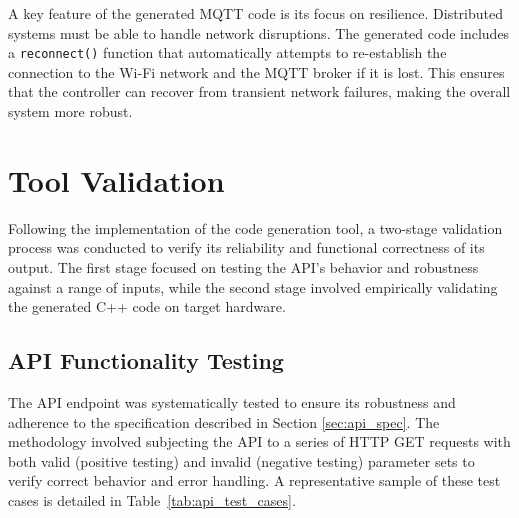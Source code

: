 A key feature of the generated MQTT code is its focus on resilience. Distributed systems must be able to handle network disruptions. The generated code includes a \texttt{reconnect()} function that automatically attempts to re-establish the connection to the Wi-Fi network and the MQTT broker if it is lost. This ensures that the controller can recover from transient network failures, making the overall system more robust.


\section{Tool Validation}
\label{sec:tool_validation}

  Following the implementation of the code generation tool, a two-stage validation process was conducted to verify its reliability and functional correctness of its output. The first stage focused on testing the API's behavior and robustness against a range of inputs, while the second stage involved empirically validating the generated C++ code on target hardware.

\subsection{API Functionality Testing}
\label{subsec:api_testing}

  The API endpoint was systematically tested to ensure its robustness and adherence to the specification described in Section \ref{sec:api_spec}. The methodology involved subjecting the API to a series of HTTP GET requests with both valid (positive testing) and invalid (negative testing) parameter sets to verify correct behavior and error handling. A representative sample of these test cases is detailed in Table~\ref{tab:api_test_cases}.

